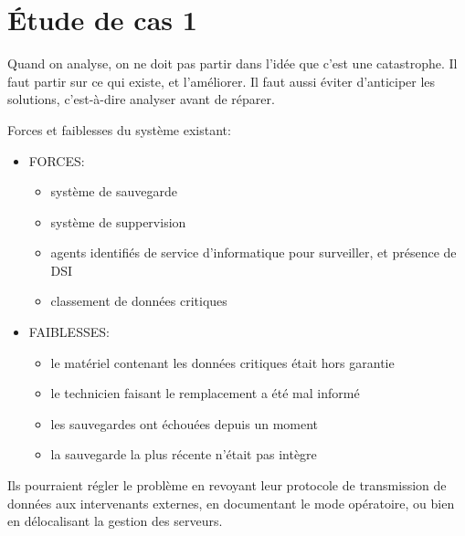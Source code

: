 \section{\'Etude de cas 1}
Quand on analyse, on ne doit pas partir dans l'id\'ee que c'est une catastrophe. Il faut partir sur ce qui existe, et
l'am\'eliorer. Il faut aussi \'eviter d'anticiper les solutions, c'est-\`a-dire analyser avant de r\'eparer.

Forces et faiblesses du syst\`eme existant:
\begin{itemize}
  \item FORCES:
  \begin{itemize}
    \item syst\`eme de sauvegarde
    \item syst\`eme de suppervision
    \item agents identifi\'es de service d'informatique pour surveiller, et pr\'esence de DSI
    \item classement de donn\'ees critiques
  \end{itemize}
  \item FAIBLESSES:
  \begin{itemize}
    \item le mat\'eriel contenant les donn\'ees critiques \'etait hors garantie
    \item le technicien faisant le remplacement a \'et\'e mal inform\'e
    \item les sauvegardes ont \'echou\'ees depuis un moment
    \item la sauvegarde la plus r\'ecente n'\'etait pas int\`egre
  \end{itemize}
\end{itemize}

Ils pourraient r\'egler le probl\`eme en revoyant leur protocole de transmission de donn\'ees aux intervenants externes,
en documentant le mode op\'eratoire, ou bien en d\'elocalisant la gestion des serveurs.
